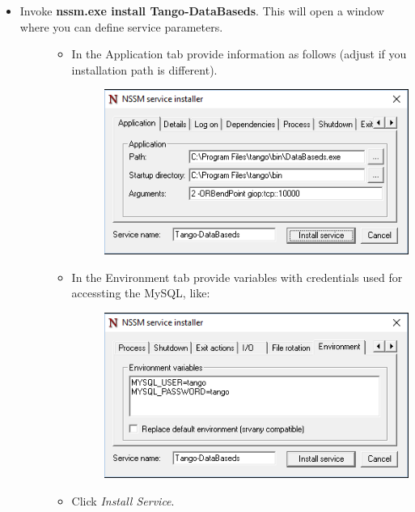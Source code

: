 \documentclass[letterpaper,10pt,english]{sphinxmanual}
\begin{document}
\begin{itemize}
\begin{description}
\begin{itemize}
\item {} \begin{description}
\item[{Invoke \textbf{nssm.exe install Tango-DataBaseds}. This will open a window where you can define service parameters.}] \leavevmode\begin{itemize}
\item {} \begin{description}
\item[{In the Application tab provide information as follows (adjust if you installation path is different).}] \leavevmode
\includegraphics{databaseds-as-service-01.png}

\end{description}

\item {} \begin{description}
\item[{In the Environment tab provide variables with credentials used for accessting the MySQL, like:}] \leavevmode
\includegraphics{databaseds-as-service-02.png}

\end{description}

\item {} 
Click \emph{Install Service}.

\end{itemize}


\end{description}
\end{itemize}
\end{description}
\end{itemize}
\end{document}
